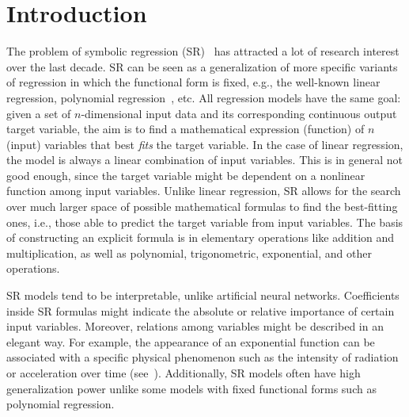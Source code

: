 \documentclass{bmcart}
\begin{document}

	\section{Introduction}\label{sec:introduction}

The problem of symbolic regression (SR)~\cite{billard2002symbolic} has attracted a lot of research interest over the last decade. SR can be seen as a generalization of more specific variants of regression in which the functional form is fixed, e.g., the well-known linear regression, polynomial regression~\cite{stimson1978interpreting}, etc. All regression models have the same goal: given a set of $n$-dimensional input data and its corresponding continuous output target variable, the aim is to find a  mathematical expression (function) of $n$ (input) variables that best \emph{fits} the target variable.  %
In the case of linear regression, the model is always a linear combination of input variables. This is in general not good enough, since the target variable might be dependent on a nonlinear function among input variables. Unlike linear regression, SR allows for the search over much larger space of possible mathematical formulas to find the best-fitting ones, i.e., those able to predict the target variable from input variables. The basis of constructing an explicit formula is in elementary operations like addition and multiplication, as well as polynomial, trigonometric, exponential, and other operations.  

SR models tend to be interpretable, unlike artificial neural networks. Coefficients inside SR formulas might indicate the absolute or relative importance of certain input variables. Moreover, relations among variables might be described in an elegant way. For example, the appearance of an exponential function can be associated with a specific physical phenomenon such as the intensity of radiation or acceleration over time (see~\cite{udrescu2020ai}). Additionally, SR models often have high generalization power unlike some models with fixed functional forms such as polynomial regression. 
\end{document}
